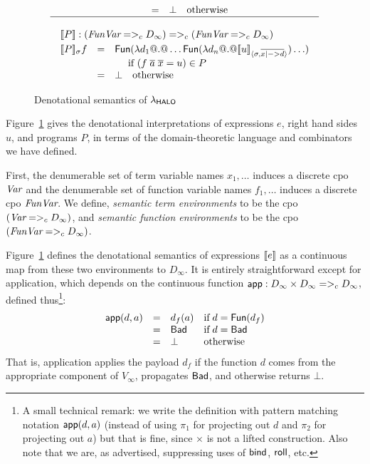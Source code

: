 \begin{figure}
$$\begin{array}{c}
\begin{array}{rcl}
          & = & \bot \quad \text{otherwise}
\end{array} \\
\hline \\
\begin{array}{rcl}
\multicolumn{3}{l}{\dbrace{P} : (\FVarCpo =>_c D_{\infty}) =>_c (\FVarCpo =>_c D_{\infty})}  \\[1mm]
\dbrace{P}_{\sigma} f & = & \roll{\ret{\injFun{\dlambda d_1 @.@ \ldots
       \roll{\ret{\injFun{\dlambda d_n @.@ \interp{u}{\sigma}{\ol{x |-> d}}}}}\ldots}}} \\
 && \quad \text{ if } (f\;\ol{a}\;\ol{x} = u) \in P \\
          & = & \bot \quad \text{otherwise}
\end{array}
\end{array}
$$
\caption{Denotational semantics of $\lambda_{\sf HALO}$} \label{f:denot}
\end{figure}

Figure~\ref{f:denot} gives the denotational interpretations
of expressions $e$, right hand sides $u$, and programs $P$, in
terms of the domain-theoretic language and combinators we have defined.

First, the denumerable set of term variable names $x_1,\ldots$ induces a discrete
cpo $\textit{Var}$  and the denumerable set of function variable names $f_1,\ldots$ induces a discrete
cpo $\textit{FunVar}$. We define, {\em semantic term environments} to be the cpo $(\textit{Var} =>_c D_{\infty})$,
and {\em semantic function environments} to be the cpo $(\textit{FunVar} =>_c D_{\infty})$.

Figure~\ref{f:denot} defines the denotational semantics of expressions
$[\![e]\!]$ as a continuous map from these two environments to $D_{\infty}$.
It is entirely straightforward except for application, which depends on
the continuous function $\mathsf{app} : D_\infty \times D_\infty =>_c D_\infty$,
defined thus\footnote{
A small technical remark: we write
the definition with pattern matching notation
$\mathsf{app}(d,a)$ (instead of using $\pi_1$ for projecting
out $d$ and $\pi_2$ for projecting out $a$) but that is fine,
since $\times$ is not a lifted construction.
Also note that we are, as advertised, suppressing uses
of $\mathsf{bind}$, $\mathsf{roll}$, etc.
}:
{\setlength{\arraycolsep}{2pt}
\[\begin{array}{rcll}
  \mathsf{app}(d,a) & = & d_f(a)    & \mbox{if}\; d = \mathsf{Fun}(d_f) \\
             & = & \mathsf{Bad} & \mbox{if}\; d = \mathsf{Bad} \\
             & = & \bot    & \mbox{otherwise}
\end{array}\]}%
That is, application applies the payload $d_f$
if the function $d$ comes
from the appropriate component of $V_{\infty}$, propagates $\mathsf{Bad}$,
and otherwise returns $\bot$.  %

